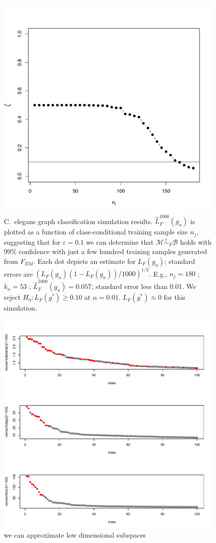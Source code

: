 \documentclass{article}
\newcommand{\mB}{\mathcal{B}}
\newcommand{\mM}{\mathcal{M}}
\newcommand{\hL}{\widehat{L}}
\newcommand{\MeB}{\mM \overset{\varepsilon}{{\sim}}_F \mB}
\begin{document}
\begin{figure}[h!]
\centering \includegraphics[width=.9\linewidth]{Lhatplot}
\caption{C.~elegans graph classification simulation results. $\hL^{1000}_{F}(g_n)$ is plotted as a function of class-conditional training sample size $n_j$, suggesting that for $\varepsilon=0.1$ we can determine that $\MeB$ holds with $99\%$ confidence with just a few hundred training samples generated from $F_{BM}$. Each dot depicts an estimate for $L_{F}(g_n)$; standard errors are $(L_{F}(g_n)(1-L_{F}(g_n))/1000)^{1/2}$. E.g., $n_j = 180$ ; $k_n = 53$ ; $\hL^{1000}_{F}(g_n) = 0.057$; standard error less than 0.01. We reject $H_0: L_{F}(g^*) \geq 0.10$ at $\alpha=0.01$. $L_{F}(g^*) \approx 0$ for this simulation.
}
\label{fig:Lhat}
\end{figure}

\begin{figure}[h!]
\centering \includegraphics[width=.9\linewidth]{subspacerecovery}
\caption{we can approximate low dimensional subspaces
}
\label{fig:Lhat}
\end{figure}
\end{document}
